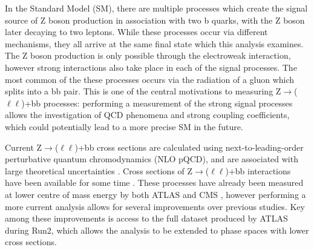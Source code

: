 \documentclass[12pt,a4paper,epsf,portrait,times,epsfig]{report}
\begin{document}
	In the Standard Model (SM), there are multiple processes which create the signal source of Z boson production in association with two b quarks, with the Z boson later decaying to two leptons. While these processes occur via different mechanisms, they all arrive at the same final state which this analysis examines. The Z boson production is only possible through the electroweak interaction, however strong interactions also take place in each of the signal processes. The most common of the these processes occurs via the radiation of a gluon which splits into a bb pair. This is one of the central motivations to measuring Z$\rightarrow$($\ell\ell$)+bb processes: performing a measurement of the strong signal processes allows the investigation of QCD phenomena and strong coupling coefficients, which could potentially lead to a more precise SM in the future. \par
	
	Current Z$\rightarrow$($\ell\ell$)+bb cross sections are calculated using next-to-leading-order perturbative quantum chromodynamics (NLO pQCD), and are associated with large theoretical uncertainties \cite{Article:EarlyQCDCrossSections}. Cross sections of Z$\rightarrow$($\ell\ell$)+bb interactions have been available for some time \cite{Article:HeavyFlavourXsec1, Article:HeavyFlavourXsec2, Article:HeavyFlavourXsec3}. These processes have already been measured at lower centre of mass energy by both ATLAS \cite{Article:EarlyATLASCrossSecMeasurement}
	and CMS \cite{Article:EarlyCMSCrossSecMeasurement}, however performing a more current analysis allows for several improvements over previous studies. Key among these improvements is access to the full dataset produced by ATLAS during Run2, which allows the analysis to be extended to phase spaces with lower cross sections. \par
	

	
\end{document}
